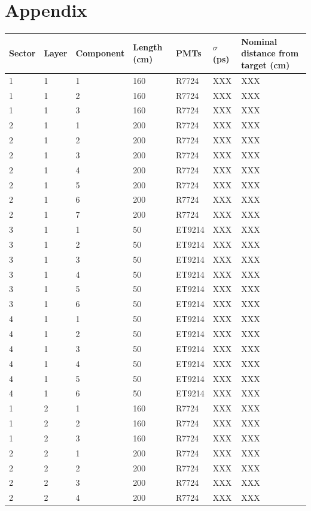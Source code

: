 \documentclass[review]{elsarticle}
\begin{document}
\section{Appendix}
\begin{longtable}{  m{3em} | m{3em} | m{5em} | m{3em} | m{3em} | m{3em} | m{8em} }
		\hline
			Sector & Layer & Component & Length (\si{\centi\meter}) & PMTs  & $\sigma$ (\si{\pico\second}) & Nominal distance from target (\si{\centi\meter}) \\
		\hline
		\hline
1	&1	&1	&160	&R7724	&XXX	&XXX\\ 
1	&1	&2	&160	&R7724	&XXX	&XXX\\ 
1	&1	&3	&160	&R7724	&XXX	&XXX\\ 
2	&1	&1	&200	&R7724	&XXX	&XXX\\ 
2	&1	&2	&200	&R7724	&XXX	&XXX\\ 
2	&1	&3	&200	&R7724	&XXX	&XXX\\ 
2	&1	&4	&200	&R7724	&XXX	&XXX\\ 
2	&1	&5	&200	&R7724	&XXX	&XXX\\ 
2	&1	&6	&200	&R7724	&XXX	&XXX\\ 
2	&1	&7	&200	&R7724	&XXX	&XXX\\ 
3	&1	&1	&50	&ET9214	&XXX	&XXX\\ 
3	&1	&2	&50	&ET9214	&XXX	&XXX\\ 
3	&1	&3	&50	&ET9214	&XXX	&XXX\\ 
3	&1	&4	&50	&ET9214	&XXX	&XXX\\ 
3	&1	&5	&50	&ET9214	&XXX	&XXX\\ 
3	&1	&6	&50	&ET9214	&XXX	&XXX\\ 
4	&1	&1	&50	&ET9214	&XXX	&XXX\\ 
4	&1	&2	&50	&ET9214	&XXX	&XXX\\ 
4	&1	&3	&50	&ET9214	&XXX	&XXX\\ 
4	&1	&4	&50	&ET9214	&XXX	&XXX\\ 
4	&1	&5	&50	&ET9214	&XXX	&XXX\\ 
4	&1	&6	&50	&ET9214	&XXX	&XXX\\ 
1	&2	&1	&160	&R7724	&XXX	&XXX\\ 
1	&2	&2	&160	&R7724	&XXX	&XXX\\ 
1	&2	&3	&160	&R7724	&XXX	&XXX\\ 
2	&2	&1	&200	&R7724	&XXX	&XXX\\ 
2	&2	&2	&200	&R7724	&XXX	&XXX\\ 
2	&2	&3	&200	&R7724	&XXX	&XXX\\ 
2	&2	&4	&200	&R7724	&XXX	&XXX\\ 

\end{longtable}
\end{document}
